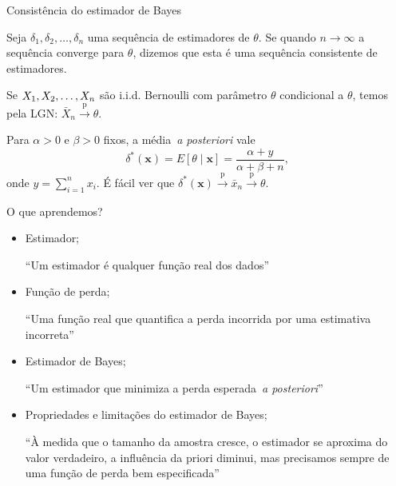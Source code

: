 \begin{frame}{Consistência do estimador de Bayes}
\begin{defn}
Seja $\delta_1, \delta_2, \ldots, \delta_n$ uma sequência de estimadores de $\theta$.
Se quando $n \to \infty$ a sequência converge para $\theta$, dizemos que esta é uma sequência consistente de estimadores.
\end{defn} 

\begin{obs}
 Se $X_1, X_2, \ldots, X_n$ são i.i.d. Bernoulli com parâmetro $\theta$ condicional a $\theta$, temos pela LGN: $\bar{X}_n \xrightarrow{\text{p}} \theta$.
\end{obs}

\begin{obs}
 Para $\alpha > 0$ e $\beta > 0$ fixos, a média~\textit{a posteriori} vale
 $$\delta^\ast(\boldsymbol{x}) = E[\theta \mid \boldsymbol{x}] = \frac{\alpha + y}{\alpha + \beta + n}, $$
 onde $ y = \sum_{i=1}^n x_i$.
 É fácil ver que $\delta^\ast(\boldsymbol{x}) \xrightarrow{\text{p}} \bar{x}_n \xrightarrow{\text{p}} \theta$.
\end{obs}


\end{frame}

\begin{frame}{O que aprendemos?}
\begin{itemize}
 \item[\faLightbulbO] Estimador;
 
  ``Um estimador é qualquer função real dos dados''
  
 \item[\faLightbulbO] Função de perda;
 
  ``Uma função real que quantifica a perda incorrida por uma estimativa incorreta'' 
 
 \item[\faLightbulbO] Estimador de Bayes;
 
  ``Um estimador que minimiza a perda esperada~\textit{a posteriori}''
  
 \item[\faLightbulbO] Propriedades e limitações do estimador de Bayes;
 
  ``À medida que o tamanho da amostra cresce, o estimador se aproxima do valor verdadeiro, a influência da priori diminui, mas precisamos sempre de uma função de perda bem especificada'' 
 \end{itemize}
 
 \end{frame}

